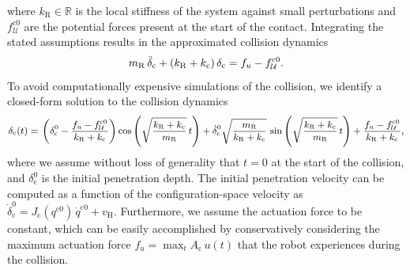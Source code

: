 where $k_\mathrm{R} \in \mathbb{R}$ is the local stiffness of the system against small perturbations and $f_\mathcal{U}^{\mathrm{c0}}$ are the potential forces present at the start of the contact.
Integrating the stated assumptions results in the approximated collision dynamics
\begin{equation}\label{eq:safetymetric:simplified_collision_dynamics}
    m_\mathrm{R} \, \Ddot{\delta}_\mathrm{c} + (k_\mathrm{R} + k_\mathrm{c}) \, \delta_\mathrm{c} = f_u - f_\mathcal{U}^{\mathrm{c0}}.
\end{equation}
To avoid computationally expensive simulations of the collision, we identify a closed-form solution to the collision dynamics
\begin{equation}\small\label{eq:safetymetric:collision_dynamics_cfs}
\begin{split}
    \delta_\mathrm{c}(t) =& \: \left (\delta_\mathrm{c}^0-\frac{f_u-f_\mathcal{U}^{\mathrm{c0}}}{k_\mathrm{R} + k_\mathrm{c}} \right ) \cos \left ( \sqrt{\frac{k_\mathrm{R} + k_\mathrm{c}}{m_\mathrm{R}}} \, t \right ) + \dot{\delta}_\mathrm{c}^0 \sqrt{\frac{m_\mathrm{R}}{k_\mathrm{R} + k_\mathrm{c}}} \, \sin \left ( \sqrt{\frac{k_\mathrm{R} + k_\mathrm{c}}{m_\mathrm{R}}} \, t \right ) + \frac{f_u-f_\mathcal{U}^{\mathrm{c0}}}{k_\mathrm{R} + k_\mathrm{c}},\\
\end{split}
\end{equation}
where we assume without loss of generality that $t=0$ at the start of the collision, and $\delta_\mathrm{c}^0$ is the initial penetration depth.
The initial penetration velocity can be computed as a function of the configuration-space velocity as $\dot{\delta}_\mathrm{c}^0 = J_\mathrm{c}(q^{\mathrm{c}0}) \, \dot{q}^{\mathrm{c}0} + v_\mathrm{H}$.
Furthermore, we assume the actuation force to be constant, which can be easily accomplished by conservatively considering the maximum actuation force $f_u = \max_t A_\mathrm{c} \, u(t)$ that the robot experiences during the collision.


